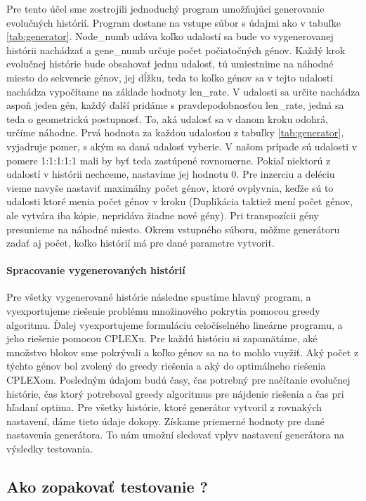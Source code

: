Pre tento účel sme zostrojili jednoduchý program umožňujúci generovanie evolučných histórií.
Program dostane na vstupe súbor s údajmi ako v tabuľke \ref{tab:generator}.
Node\_numb udáva koľko udalostí sa bude vo vygenerovanej histórii nachádzať
a gene\_numb určuje počet počiatočných génov. Každý krok evolučnej histórie bude obsahovať jednu udalosť, 
tú umiestnime na náhodné miesto do sekvencie génov,
jej dĺžku, teda to koľko génov sa v tejto udalosti nachádza vypočítame na základe hodnoty len\_rate.
V udalosti sa určite nachádza aspoň jeden gén, každý ďalší pridáme s pravdepodobnosťou len\_rate, jedná sa teda o geometrickú postupnosť.
To, aká udalosť sa v danom kroku odohrá, určíme náhodne. Prvá hodnota za každou udalosťou z tabuľky \ref{tab:generator}, 
vyjadruje pomer, s akým sa daná udalosť vyberie. V našom prípade sú udalosti v pomere 1:1:1:1:1 mali by byť teda zastúpené rovnomerne.
Pokiaľ niektorú z udalostí v histórii nechceme, nastavíme jej hodnotu 0. Pre inzerciu a deléciu vieme navyše nastaviť maximálny počet génov,
ktoré ovplyvnia, 
keďže sú to udalosti ktoré menia počet génov v kroku (Duplikácia taktiež mení počet génov, ale vytvára iba kópie, nepridáva žiadne nové gény).
Pri transpozícii gény presunieme na náhodné miesto.
Okrem vstupného súboru, môžme generátoru zadať aj počet, koľko histórií má pre dané parametre vytvoriť.
\paragraph{Spracovanie vygenerovaných histórií}
Pre všetky vygenerované histórie následne spustíme hlavný program, a vyexportujeme riešenie problému množinového pokrytia 
pomocou greedy algoritmu.
Ďalej vyexportujeme formuláciu celočíselného lineárne programu, a jeho riešenie pomocou CPLEXu.
Pre každú históriu si zapamätáme, aké množstvo blokov sme pokrývali a koľko génov sa na to mohlo vuyžiť.
Aký počet z týchto génov bol zvolený do greedy riešenia a aký do optimálneho riešenia CPLEXom.
Posledným údajom budú časy, čas potrebný pre načítanie evolučnej histórie, čas ktorý potreboval greedy algoritmus pre nájdenie riešenia a čas pri hľadaní optima.
Pre všetky histórie, ktoré generátor vytvoril z rovnakých nastavení, dáme tieto údaje dokopy. Získame priemerné hodnoty pre dané nastavenia generátora. 
To nám umožní sledovať vplyv nastavení generátora na výsledky testovania.
\subsection{Ako zopakovať testovanie ?}
\label{sub:akotestovat}

